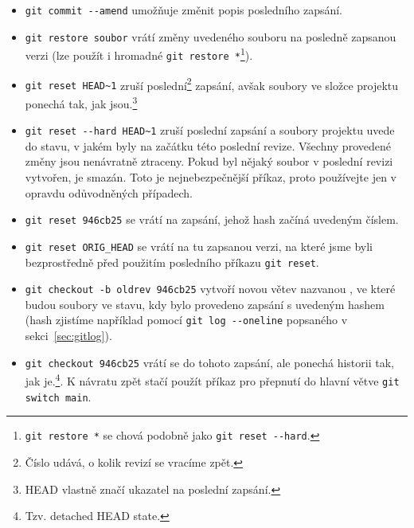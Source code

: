 \documentclass[a4paper,11pt,twoside]{article}
\def\code#1{\textnormal{\texttt{#1}}}
\theoremstyle{red}
\theoremstyle{green}
\begin{document}
    \begin{itemize}
        \item \code{git commit -{}-amend} umožňuje změnit popis posledního zapsání.
        \item \code{git restore soubor} vrátí změny uvedeného souboru na posledně zapsanou verzi (lze použít i hromadné \code{git restore *}\footnote{\code{git restore *} se chová podobně jako \code{git reset -{}-hard}.}).
        \item \code{git reset HEAD\~{}1} zruší poslední\footnote{Číslo udává, o kolik revizí se vracíme zpět.} zapsání, avšak soubory ve složce projektu ponechá tak, jak jsou.\footnote{HEAD vlastně značí ukazatel na poslední zapsání.}
        \item \code{git reset -{}-hard HEAD\~{}1} zruší poslední zapsání a soubory projektu uvede do stavu, v jakém byly na začátku této poslední revize. 
        Všechny provedené změny jsou nenávratně ztraceny.
        Pokud byl nějaký soubor v poslední revizi vytvořen, je smazán.
        Toto je nejnebezpečnější příkaz, proto používejte jen v opravdu odůvodněných případech.
        \item \code{git reset 946cb25} se vrátí na zapsání, jehož hash začíná uvedeným číslem.
        \item \code{git reset ORIG_HEAD} se vrátí na tu zapsanou verzi, na které jsme byli bezprostředně před použitím posledního příkazu \code{git reset}.
        \item \code{git checkout -b oldrev 946cb25} vytvoří novou větev nazvanou , ve které budou soubory ve stavu, kdy bylo provedeno zapsání s uvedeným hashem (hash zjistíme například pomocí \code{git log -{}-oneline} popsaného v sekci~\ref{sec:gitlog}).
        \item \code{git checkout 946cb25} vrátí se do tohoto zapsání, ale ponechá historii tak, jak je.\footnote{Tzv. detached HEAD state.}.
            K návratu zpět stačí použít příkaz pro přepnutí do hlavní větve \code{git switch main}.
    \end{itemize}
\end{document}

